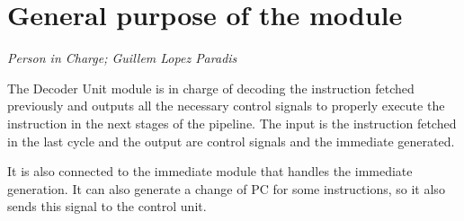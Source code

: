 \newpage
\section{General purpose of the module}
\textit{Person in Charge; Guillem Lopez Paradis}

The Decoder Unit module is in charge of decoding the instruction fetched previously and outputs all the necessary control signals to properly execute the instruction in the next stages of the pipeline. The input is the instruction fetched in the last cycle and the output are control signals and the immediate generated.

It is also connected to the immediate module that handles the immediate generation. It can also generate a change of PC for some instructions, so it also sends this signal to the control unit.

